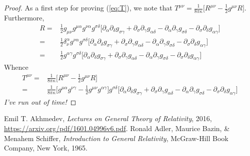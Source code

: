 \documentclass[]{article}
\begin{document}
\begin{proof}
	
	As a first step for proving (\ref{eq:T}), we note that $T^{\mu\nu}=\frac{1}{8\pi\kappa}\big[R^{\mu\nu}-\frac{1}{2}g^{\mu\nu}R\big]$. Furthermore,
	\begin{align*}
	R=&\frac{1}{2}g_{\mu\nu}g^{\mu\alpha}g^{\nu\alpha}g^{\sigma\delta}\big[\partial_{\alpha}\partial_{\delta}g_{\sigma\gamma} + \partial_{\sigma}\partial_{\gamma}g_{\alpha\delta} - \partial_{\alpha}\partial_{\gamma}g_{\sigma\delta} - \partial_{\sigma}\partial_{\delta}g_{\alpha\gamma}\big]\\
	=&\frac{1}{2}\delta^{\alpha}_{\nu}g^{\nu\alpha}g^{\sigma\delta}\big[\partial_{\alpha}\partial_{\delta}g_{\sigma\gamma} + \partial_{\sigma}\partial_{\gamma}g_{\alpha\delta} - \partial_{\alpha}\partial_{\gamma}g_{\sigma\delta} - \partial_{\sigma}\partial_{\delta}g_{\alpha\gamma}\big]\\
	=&\frac{1}{2}g^{\alpha\gamma}g^{\sigma\delta}\big[\partial_{\alpha}\partial_{\delta}g_{\sigma\gamma} + \partial_{\sigma}\partial_{\gamma}g_{\alpha\delta} - \partial_{\alpha}\partial_{\gamma}g_{\sigma\delta} - \partial_{\sigma}\partial_{\delta}g_{\alpha\gamma}\big]
	\end{align*}
	Whence
	\begin{align*}
	T^{\mu\nu}=&\frac{1}{8\pi\kappa}\big[R^{\mu\nu}-\frac{1}{2}g^{\mu\nu}R\big]\\
	=&\frac{1}{8\pi\kappa}\big[ g^{\mu\alpha}g^{\nu\gamma} - \frac{1}{2}g^{\mu\nu}g^{\alpha\gamma}  \big]g^{\sigma\delta}\big[\partial_{\alpha}\partial_{\delta}g_{\sigma\gamma} + \partial_{\sigma}\partial_{\gamma}g_{\alpha\delta} - \partial_{\alpha}\partial_{\gamma}g_{\sigma\delta} - \partial_{\sigma}\partial_{\delta}g_{\alpha\gamma}\big]
	\end{align*}
	\emph{I've run out of time!}
\end{proof}

\begin{thebibliography}{9}
	
	Emil T. Akhmedev,
	\emph{Lectures on General Theory of Relativity},
	2016,
	\url{https://arxiv.org/pdf/1601.04996v6.pdf}.
	Ronald Adler, Maurice Bazin, \& Menahem Schiffer,
	\emph{Introduction to General Relativity},
	McGraw-Hill Book Company, New York,
	1965.
	
	
\end{thebibliography}
\end{document}
